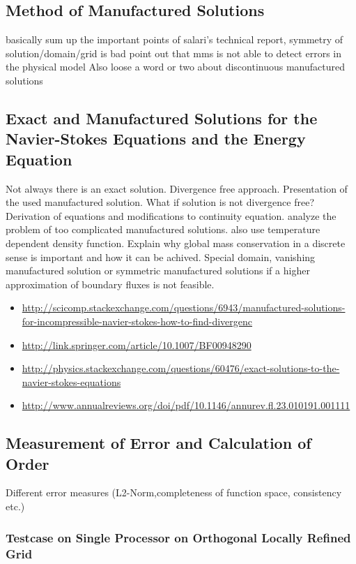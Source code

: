 \documentclass[article,type=msc,colorback,accentcolor=tud2a]{tudthesis}
\begin{document}
    \subsection{Method of Manufactured Solutions}
      basically sum up the important points of salari's technical report, symmetry of solution/domain/grid is bad
      point out that mms is not able to detect errors in the physical model
      Also loose a word or two about discontinuous manufactured solutions

    \subsection{Exact and Manufactured Solutions for the Navier-Stokes Equations and the Energy Equation}
    Not always there is an exact solution. Divergence free approach. Presentation of the used manufactured solution. What if solution is not divergence free? Derivation of equations and modifications to continuity equation. analyze the problem of too complicated manufactured solutions. also use temperature dependent density function. Explain why global mass conservation in a discrete sense is important and how it can be achived. Special domain, vanishing manufactured solution or symmetric manufactured solutions if a higher approximation of boundary fluxes is not feasible.
    \begin{itemize}
      \item \url{http://scicomp.stackexchange.com/questions/6943/manufactured-solutions-for-incompressible-navier-stokes-how-to-find-divergenc}
      \item \url{http://link.springer.com/article/10.1007/BF00948290}
      \item \url{http://physics.stackexchange.com/questions/60476/exact-solutions-to-the-navier-stokes-equations}
      \item \url{http://www.annualreviews.org/doi/pdf/10.1146/annurev.fl.23.010191.001111}
    \end{itemize}

    \subsection{Measurement of Error and Calculation of Order}
      Different error measures (L2-Norm,completeness of function space, consistency etc.)

      \subsubsection{Testcase on Single Processor on Orthogonal Locally Refined Grid}
\end{document}

